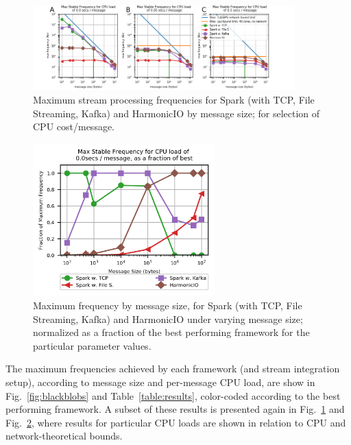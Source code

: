 \documentclass[conference]{IEEEtran}
\begin{document}
\begin{figure}[h]

\begin{center}
\includegraphics[width=0.9\textwidth]{images/selected_simple_plots.png}
\end{center}
\caption{Maximum stream processing frequencies for Spark (with TCP, File Streaming, Kafka) and HarmonicIO by message size; for selection of CPU cost/message.}
\label{fig:all-results}
\end{figure}

\begin{figure}[h]
\begin{center}
\includegraphics[width=7cm]{images/normalized_0.png}
\end{center}
\caption{Maximum frequency by message size, for Spark (with TCP, File Streaming, Kafka) and HarmonicIO under varying message size; normalized as a fraction of the best performing framework for the particular parameter values.}
\label{fig:result-normed}
\end{figure}


The maximum frequencies achieved by each framework (and stream integration setup), according to message size and per-message CPU load, are show in Fig.~\ref{fig:blackblobs} and Table~\ref{table:results}, color-coded according to the best performing framework. 
A subset of these results is presented again in Fig.~\ref{fig:all-results} and Fig.~\ref{fig:result-normed}, where results for particular CPU loads are shown in relation to CPU and network-theoretical bounds.
\end{document}

